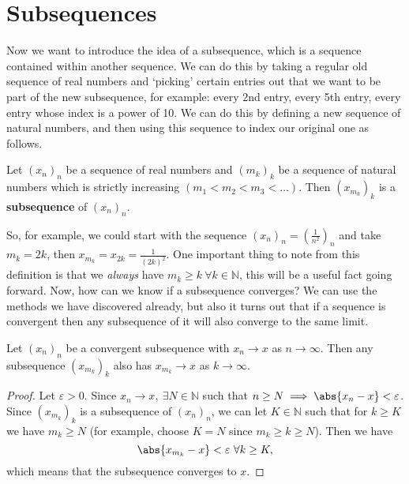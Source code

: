 \documentclass[../real_analysis.tex]{subfiles}
\begin{document}
    \section{Subsequences}\label{sec:subsequences}
        Now we want to introduce the idea of a subsequence, which is a sequence contained within another sequence.
        We can do this by taking a regular old sequence of real numbers and `picking' certain entries out that we want to be part of the new subsequence, for example: every 2nd entry, every 5th entry, every entry whose index is a power of 10. We can do this by defining a new sequence of natural numbers, and then using this sequence to index our original one as follows.
        \begin{definition}
            Let $(x_n)_n$ be a sequence of real numbers and $(m_k)_k$ be a sequence of natural numbers which is strictly increasing $(m_1<m_2<m_3<\dots)$. Then $(x_{m_k})_k$ is a \textbf{subsequence} of $(x_n)_n$.
        \end{definition}
        So, for example, we could start with the sequence $(x_n)_n=\left(\frac{1}{n^2}\right)_n$ and take $m_k=2k$, then $x_{m_k}=x_{2k}=\frac{1}{(2k)^2}$. One important thing to note from this definition is that we \textit{always} have $m_k\geq k\ \forall k\in\mathbb{N}$, this will be a useful fact going forward. Now, how can we know if a subsequence converges? We can use the methods we have discovered already, but also it turns out that if a sequence is convergent then any subsequence of it will also converge to the same limit.
        \begin{theorem}
            Let $(x_n)_n$ be a convergent subsequence with $x_n\to x$ as $n\to\infty$. Then any subsequence $(x_{m_k})_k$ also has $x_{m_k}\to x$ as $k\to\infty$.
        \end{theorem}
        \begin{proof}
            Let $\varepsilon>0$. Since $x_n\to x,\ \exists N\in\mathbb{N}$ such that $n\geq N\implies\abs{x_n-x}<\varepsilon$. Since $(x_{m_k})_k$ is a subsequence of $(x_n)_n$, we can let $K\in\mathbb{N}$ such that for $k\geq K$ we have $m_k\geq N$ (for example, choose $K=N$ since $m_k\geq k\geq N$). Then we have
            \begin{equation}
                \abs{x_{m_k}-x}<\varepsilon\ \forall k\geq K,
            \end{equation}
            which means that the subsequence converges to $x$.
        \end{proof}
\end{document}
